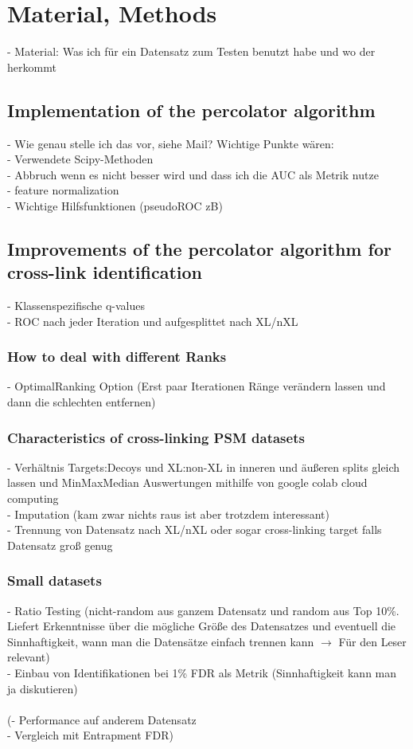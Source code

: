 \documentclass[10pt,a4paper]{article}
\begin{document}
	\section{Material, Methods}
	
		- Material: Was ich für ein Datensatz zum Testen benutzt habe und wo der herkommt
	
		\subsection{Implementation of the percolator algorithm}
			- Wie genau stelle ich das vor, siehe Mail? Wichtige Punkte wären:\\
			- Verwendete Scipy-Methoden\\
			- Abbruch wenn es nicht besser wird und dass ich die AUC als Metrik nutze\\
			- feature normalization\\
			- Wichtige Hilfsfunktionen (pseudoROC zB)
			
		\subsection{Improvements of the percolator algorithm for cross-link identification}
			- Klassenspezifische q-values\\
			- ROC nach jeder Iteration und aufgesplittet nach XL/nXL\\
			\subsubsection{How to deal with different Ranks}
			- OptimalRanking Option (Erst paar Iterationen Ränge verändern lassen und dann die schlechten entfernen)\\
			\subsubsection{Characteristics of cross-linking PSM datasets}
			- Verhältnis Targets:Decoys und XL:non-XL in inneren und äußeren splits gleich lassen und MinMaxMedian Auswertungen mithilfe von google colab cloud computing\\
			- Imputation (kam zwar nichts raus ist aber trotzdem interessant)\\
			- Trennung von Datensatz nach XL/nXL oder sogar cross-linking target falls Datensatz groß genug\\
			\subsubsection{Small datasets}
			- Ratio Testing (nicht-random aus ganzem Datensatz und random aus Top 10\%. Liefert Erkenntnisse über die mögliche Größe des Datensatzes und eventuell die Sinnhaftigkeit, wann man die Datensätze einfach trennen kann $\rightarrow$ Für den Leser relevant)\\
			- Einbau von Identifikationen bei 1\% FDR als Metrik (Sinnhaftigkeit kann man ja diskutieren)\\\\			
			(- Performance auf anderem Datensatz\\
			- Vergleich mit Entrapment FDR)
			
\end{document}
